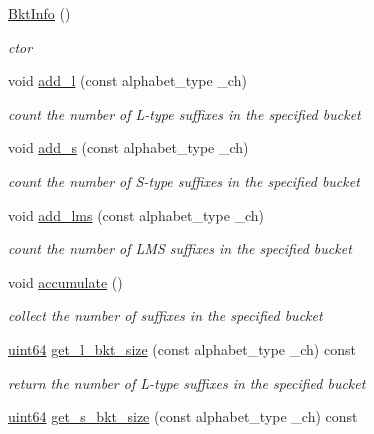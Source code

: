 \begin{DoxyCompactItemize}
\item 
\hyperlink{struct_validate4_1_1_bkt_info_ac9e39b62bee276f6a9604bff588b6ecc}{Bkt\+Info} ()
\begin{DoxyCompactList}\small\item\em ctor \end{DoxyCompactList}\item 
void \hyperlink{struct_validate4_1_1_bkt_info_af55a2b8eee03bfe617ab34759b4ac007}{add\+\_\+l} (const alphabet\+\_\+type \+\_\+ch)
\begin{DoxyCompactList}\small\item\em count the number of L-\/type suffixes in the specified bucket \end{DoxyCompactList}\item 
void \hyperlink{struct_validate4_1_1_bkt_info_a9c11b8915349954523623d9e7b0a2c2a}{add\+\_\+s} (const alphabet\+\_\+type \+\_\+ch)
\begin{DoxyCompactList}\small\item\em count the number of S-\/type suffixes in the specified bucket \end{DoxyCompactList}\item 
void \hyperlink{struct_validate4_1_1_bkt_info_a5875efc6696925c0932f262174c2cc37}{add\+\_\+lms} (const alphabet\+\_\+type \+\_\+ch)
\begin{DoxyCompactList}\small\item\em count the number of L\+MS suffixes in the specified bucket \end{DoxyCompactList}\item 
void \hyperlink{struct_validate4_1_1_bkt_info_ac4fb0eabb194f773cd4ac5f6bcbbe969}{accumulate} ()
\begin{DoxyCompactList}\small\item\em collect the number of suffixes in the specified bucket \end{DoxyCompactList}\item 
\hyperlink{types_8h_a60e8696a4678cd348e991a1f172e53f7}{uint64} \hyperlink{struct_validate4_1_1_bkt_info_ae06c1968c2288d191f59214a0f10e7d7}{get\+\_\+l\+\_\+bkt\+\_\+size} (const alphabet\+\_\+type \+\_\+ch) const
\begin{DoxyCompactList}\small\item\em return the number of L-\/type suffixes in the specified bucket \end{DoxyCompactList}\item 
\hyperlink{types_8h_a60e8696a4678cd348e991a1f172e53f7}{uint64} \hyperlink{struct_validate4_1_1_bkt_info_a0c9a5615bab7f7c22d0d3f2de4b2621c}{get\+\_\+s\+\_\+bkt\+\_\+size} (const alphabet\+\_\+type \+\_\+ch) const

\end{DoxyCompactItemize}
